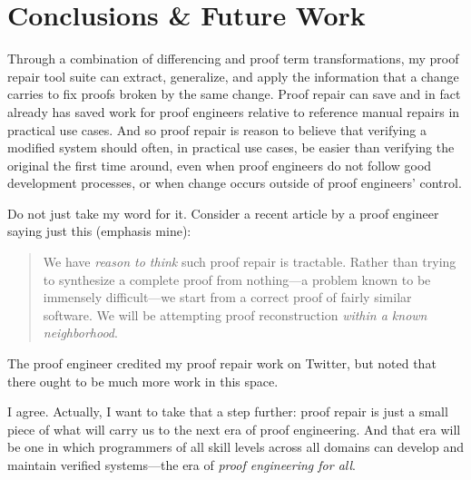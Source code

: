 \chapter{Conclusions \& Future Work}
\label{chapt:conclusions}

Through a combination of differencing and proof term transformations,
my proof repair tool suite can extract, generalize, and apply the information that a change carries to fix proofs broken by the same change.
Proof repair can save and in fact already has saved work for proof engineers relative to reference manual repairs in practical use cases.
And so proof repair is reason to believe that verifying a modified system should often, in practical use cases, be easier than verifying the original the first time around,
even when proof engineers do not follow good development processes,
or when change occurs outside of proof engineers' control.

Do not just take my word for it.
Consider a recent article by a proof engineer saying just this (emphasis mine): %

\begin{quote}
We have \textit{reason to think} such proof repair is tractable. Rather than trying to synthesize a complete proof from nothing---a problem known to be immensely difficult---we 
start from a correct proof of fairly similar software. We will be attempting proof reconstruction \textit{within a known neighborhood}.
\end{quote}
The proof engineer credited my proof repair work on Twitter, %
but noted that there ought to be much more work in this space.

I agree.
Actually, I want to take that a step further:
proof repair is just a small piece of what will carry us to the next era of proof engineering.
And that era will be one in which programmers of all skill levels across all domains can develop and maintain verified systems---the era of
\textit{proof engineering for all}.


